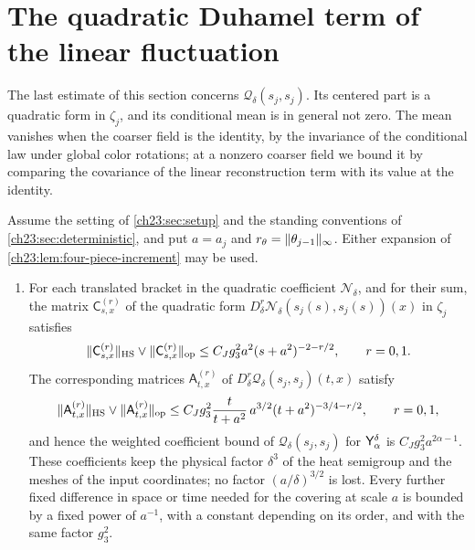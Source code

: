 \section{The quadratic Duhamel term of the linear fluctuation}\label{ch23:sec:square}

The last estimate of this section concerns $\mathcal Q_\delta(s_j,s_j)$. Its centered part is a quadratic form in $\zeta_j$, and its conditional mean is in general not zero. The mean vanishes when the coarser field is the identity, by the invariance of the conditional law under global color rotations; at a nonzero coarser field we bound it by comparing the covariance of the linear reconstruction term with its value at the identity.

\begin{theorem}\label{ch23:thm:fresh-square}
Assume the setting of \cref{ch23:sec:setup} and the standing conventions of \cref{ch23:sec:deterministic}, and put $a=a_j$ and $r_\theta=\lVert \theta_{j-1}\rVert_\infty$. Either expansion of \cref{ch23:lem:four-piece-increment} may be used.
\begin{enumerate}
\item For each translated bracket in the quadratic coefficient $\mathcal N_\delta$, and for their sum, the matrix $\mathsf C_{s,x}^{(r)}$ of the quadratic form $D_\delta^r\mathcal N_\delta(s_j(s),s_j(s))(x)$ in $\zeta_j$ satisfies
\[
 \lVert \mathsf C_{s,x}^{(r)}\rVert_{\mathrm{HS}}\vee\lVert \mathsf C_{s,x}^{(r)}\rVert_{\mathrm{op}}\le C_Jg_3^2a^2(s+a^2)^{-2-r/2},\qquad r=0,1.
\]
The corresponding matrices $\mathsf A_{t,x}^{(r)}$ of $D_\delta^r\mathcal Q_\delta(s_j,s_j)(t,x)$ satisfy
\[
 \lVert \mathsf A_{t,x}^{(r)}\rVert_{\mathrm{HS}}\vee\lVert \mathsf A_{t,x}^{(r)}\rVert_{\mathrm{op}}\le C_Jg_3^2\frac{t}{t+a^2}\,a^{3/2}(t+a^2)^{-3/4-r/2},\qquad r=0,1,
\]
and hence the weighted coefficient bound of $\mathcal Q_\delta(s_j,s_j)$ for $\mathsf Y_{\alpha}^{\delta}$ is $C_Jg_3^2a^{2\alpha-1}$. These coefficients keep the physical factor $\delta^3$ of the heat semigroup and the meshes of the input coordinates; no factor $(a/\delta)^{3/2}$ is lost. Every further fixed difference in space or time needed for the covering at scale $a$ is bounded by a fixed power of $a^{-1}$, with a constant depending on its order, and with the same factor $g_3^2$.

\end{enumerate}
\end{theorem}
